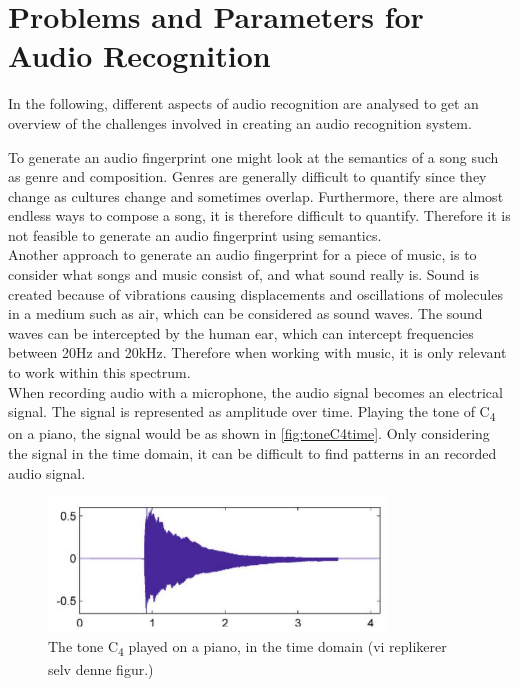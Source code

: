 \section{Problems and Parameters for Audio Recognition}
\label{sec:ParametersAudioRecognition}
In the following, different aspects of audio recognition are analysed to get an overview of the challenges involved in creating an audio recognition system.

To generate an audio fingerprint one might look at the semantics of a song such as genre and composition. Genres are generally difficult to quantify since they change as cultures change and sometimes overlap. Furthermore, there are almost endless ways to compose a song, it is therefore difficult to quantify. Therefore it is not feasible to generate an audio fingerprint using semantics. \cite{haitsma2003highly}\\
Another approach to generate an audio fingerprint for a piece of music, is to consider what songs and music consist of, and what sound really is.
Sound is created because of vibrations causing displacements and oscillations of molecules in a medium such as air, which can be considered as sound waves. The sound waves can be intercepted by the human ear, which can intercept frequencies between 20Hz and 20kHz. Therefore when working with music, it is only relevant to work within this spectrum. \cite[21]{Meinard2015Fundamentals}\\

When recording audio with a microphone, the audio signal becomes an electrical signal. The signal is represented as amplitude over time. Playing the tone of C\textsubscript{4} on a piano, the signal would be as shown in \autoref{fig:toneC4time}. Only considering the signal in the time domain, it can be difficult to find patterns in an recorded audio signal. 

\begin{figure}[H]
    \centering
    \includegraphics[width=0.8\textwidth]{figures/toneC4time.JPG}
    \caption{The tone C\textsubscript{4} played on a piano, in the time domain (vi replikerer selv denne figur.)}
    \label{fig:toneC4time}
\end{figure}

